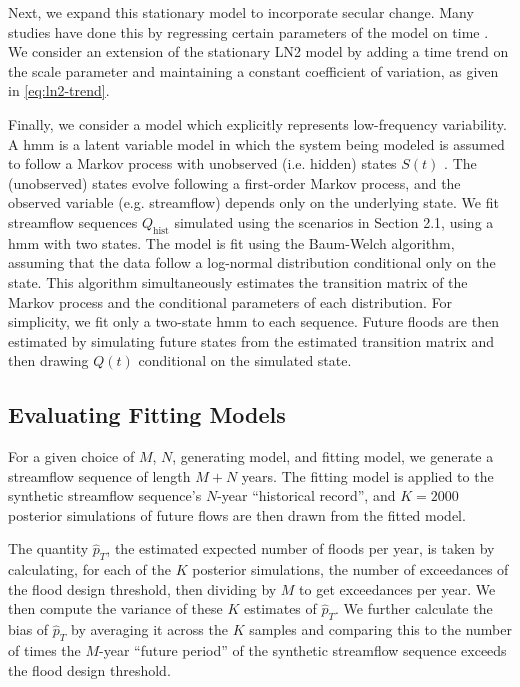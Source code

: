 \documentclass[
  draft,
  linenumbers
]{agujournal2018}
\makeatletter
\newcommand{\eg}{e.g.\@\xspace}
\newcommand{\ie}{i.e.\@\xspace}
\makeatother
\begin{document}
Next, we expand this stationary model to incorporate secular change.
Many studies have done this by regressing certain parameters of the model on time \citep{Merz:2014gf, Salas:2018ge}.
We consider an extension of the stationary LN2 model by adding a time trend on the scale parameter and maintaining a constant coefficient of variation, as given in \cref{eq:ln2-trend}.

Finally, we consider a model which explicitly represents low-frequency variability.
A \gls{hmm} is a latent variable model in which the system being modeled is assumed to follow a Markov process with unobserved (\ie{} hidden) states $S(t)$ \citep{Rabiner:1986jk}.
The (unobserved) states evolve following a first-order Markov process, and the observed variable (\eg streamflow) depends only on the underlying state.
We fit  streamflow sequences $Q_\text{hist}$ simulated using the scenarios in Section 2.1, using a \gls{hmm} with two states.
The model is fit using the Baum-Welch algorithm, assuming that the data follow a log-normal distribution conditional only on the state.
This algorithm simultaneously estimates the transition matrix of the Markov process and the conditional parameters of each distribution.
For simplicity, we fit only a two-state \gls{hmm} to each sequence.
Future floods are then estimated by simulating future states from the estimated transition matrix and then drawing $Q(t)$ conditional on the simulated state.

\subsection{Evaluating Fitting Models}\label{sec:methods-evaluating}

For a given choice of $M$, $N$, generating model, and fitting model, we generate a streamflow sequence of length $M+N$ years.
The fitting model is applied to the synthetic streamflow sequence's $N$-year ``historical record'', and $K=2000$ posterior simulations of future flows are then drawn from the fitted model.

The quantity $\hat{p}_T$, the estimated expected number of floods per year, is taken by calculating, for each of the $K$ posterior simulations, the number of exceedances of the flood design threshold, then dividing by $M$ to get exceedances per year.
We then compute the variance of these $K$ estimates of $\hat{p}_T$.
We further calculate the bias of $\hat{p}_T$ by averaging it across the $K$ samples and comparing this to the number of times the $M$-year ``future period'' of the synthetic streamflow sequence exceeds the flood design threshold.
\end{document}
